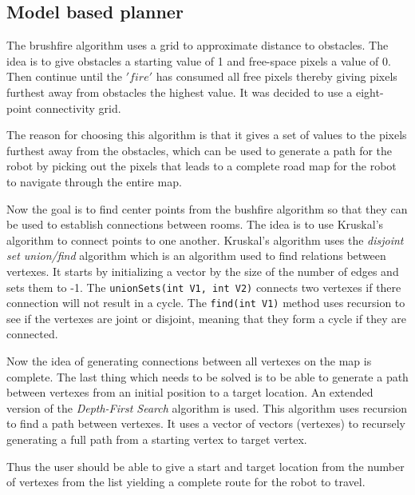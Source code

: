\documentclass[../Head/Main.tex]{subfiles}
\begin{document}
\subsection{Model based planner}
The brushfire algorithm uses a grid to approximate distance to obstacles. The idea is to give obstacles a starting value of 1 and free-space pixels a value of 0. Then continue until the $'fire'$ has consumed all free pixels thereby giving pixels furthest away from obstacles the highest value. It was decided to use a eight-point connectivity grid. \par


The reason for choosing this algorithm is that it gives a set of values to the pixels furthest away from the obstacles, which can be used to generate a path for the robot by picking out the pixels that leads to a complete road map for the robot to navigate through the entire map. 

Now the goal is to find center points from the bushfire algorithm so that they can be used to establish connections between rooms. The idea is to use Kruskal's algorithm to connect points to one another.  Kruskal's algorithm uses the \textit{disjoint set union/find} algorithm which is an algorithm used to find relations between vertexes. It starts by initializing a vector by the size of the number of edges and sets them to -1. The \texttt{unionSets(int V1, int V2)} connects two vertexes if there connection will not result in a cycle.  The \texttt{find(int V1)} method uses recursion to see if the vertexes are joint or disjoint, meaning that they form a cycle if they are connected.     


Now the idea of generating connections between all vertexes on the map is complete. The last thing which needs to be solved is to be able to generate a path between vertexes from an initial position to a target location. An extended version of the \textit{Depth-First Search} algorithm is used. This algorithm uses recursion to find a path between vertexes. It uses a vector of vectors (vertexes) to recursely generating a full path from a starting vertex to target vertex. 

Thus the user should be able to give a start and target location from the number of vertexes from the list yielding a complete route for the robot to travel.
\end{document}
